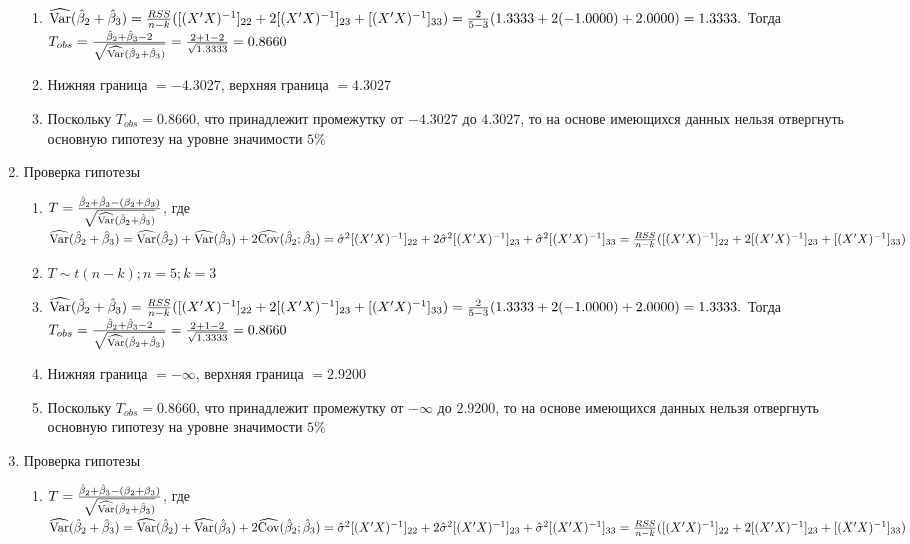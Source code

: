 \begin{solution}
\begin{enumerate}
\begin{enumerate}
\item $\widehat{\operatorname{Var}}(\hat{\beta}_2 + \hat{\beta}_3) = \frac{RSS}{n - k}([(X'X)^{-1}]_{22} + 2[(X'X)^{-1}]_{23} + [(X'X)^{-1}]_{33}) = \frac{2}{5 - 3} (1.3333 + 2(-1.0000) + 2.0000) = 1.3333.$ Тогда $T_{obs} = \frac{\hat{\beta}_2 + \hat{\beta}_3 - 2}{\sqrt{\widehat{\operatorname{Var}}(\hat{\beta}_2 + \hat{\beta}_3)}} = \frac{2 + 1 - 2}{\sqrt{1.3333}} = 0.8660$
\item Нижняя граница $= - 4.3027$, верхняя граница $= 4.3027$
\item Поскольку $T_{obs} = 0.8660$, что принадлежит промежутку от $- 4.3027$ до $4.3027$, то на основе имеющихся данных нельзя отвергнуть основную гипотезу на уровне значимости $5\%$
\end{enumerate}
\item Проверка гипотезы
\begin{enumerate}
\item $T = \frac{\hat{\beta}_2 + \hat{\beta}_3 - (\beta_2 + \beta_3)}{\sqrt{\widehat{\operatorname{Var}}(\hat{\beta}_2 + \hat{\beta}_3)}}$, где $\widehat{\operatorname{Var}}(\hat{\beta}_2 + \hat{\beta}_3) = \widehat{\operatorname{Var}}(\hat{\beta}_2) + \widehat{\operatorname{Var}}(\hat{\beta}_3) + 2\widehat{\operatorname{Cov}}(\hat{\beta}_2;\hat{\beta}_3) = \hat{\sigma}^2 [(X'X)^{-1}]_{22} + 2\hat{\sigma}^2 [(X'X)^{-1}]_{23} + \hat{\sigma}^2 [(X'X)^{-1}]_{33}= \frac{RSS}{n - k}([(X'X)^{-1}]_{22} + 2[(X'X)^{-1}]_{23} + [(X'X)^{-1}]_{33})$
\item $T \sim t(n-k); n = 5; k = 3$
\item $\widehat{\operatorname{Var}}(\hat{\beta}_2 + \hat{\beta}_3) = \frac{RSS}{n - k}([(X'X)^{-1}]_{22} + 2[(X'X)^{-1}]_{23} + [(X'X)^{-1}]_{33}) = \frac{2}{5 - 3} (1.3333 + 2(-1.0000) + 2.0000) = 1.3333.$ Тогда $T_{obs} = \frac{\hat{\beta}_2 + \hat{\beta}_3 - 2}{\sqrt{\widehat{\operatorname{Var}}(\hat{\beta}_2 + \hat{\beta}_3)}} = \frac{2 + 1 - 2}{\sqrt{1.3333}} = 0.8660$
\item Нижняя граница $= - \infty$, верхняя граница $= 2.9200$
\item Поскольку $T_{obs} = 0.8660$, что принадлежит промежутку от $- \infty$ до $2.9200$, то на основе имеющихся данных нельзя отвергнуть основную гипотезу на уровне значимости $5\%$
\end{enumerate}
\item Проверка гипотезы
\begin{enumerate}
\item $T = \frac{\hat{\beta}_2 + \hat{\beta}_3 - (\beta_2 + \beta_3)}{\sqrt{\widehat{\operatorname{Var}}(\hat{\beta}_2 + \hat{\beta}_3)}}$, где $\widehat{\operatorname{Var}}(\hat{\beta}_2 + \hat{\beta}_3) = \widehat{\operatorname{Var}}(\hat{\beta}_2) + \widehat{\operatorname{Var}}(\hat{\beta}_3) + 2\widehat{\operatorname{Cov}}(\hat{\beta}_2;\hat{\beta}_3) = \hat{\sigma}^2 [(X'X)^{-1}]_{22} + 2\hat{\sigma}^2 [(X'X)^{-1}]_{23} + \hat{\sigma}^2 [(X'X)^{-1}]_{33}= \frac{RSS}{n - k}([(X'X)^{-1}]_{22} + 2[(X'X)^{-1}]_{23} + [(X'X)^{-1}]_{33})$

\end{enumerate}
\end{enumerate}
\end{solution}
